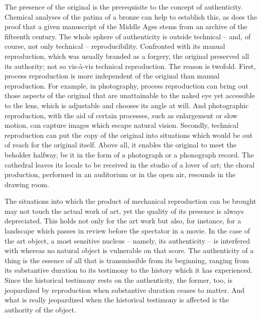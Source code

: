 \documentclass[11pt, letterpaper]{article}
\begin{document}
The presence of the original is the prerequisite to the concept of
authenticity. Chemical analyses of the patina of a bronze can help to establish
this, as does the proof that a given manuscript of the Middle Ages stems from
an archive of the fifteenth century. The whole sphere of authenticity is
outside technical – and, of course, not only technical – reproducibility.
Confronted with its manual reproduction, which was usually branded as a
forgery, the original preserved all its authority; not so vis-à-vis technical
reproduction. The reason is twofold. First, process reproduction is more
independent of the original than manual reproduction. For example, in
photography, process reproduction can bring out those aspects of the original
that are unattainable to the naked eye yet accessible to the lens, which is
adjustable and chooses its angle at will. And photographic reproduction, with
the aid of certain processes, such as enlargement or slow motion, can capture
images which escape natural vision. Secondly, technical reproduction can put
the copy of the original into situations which would be out of reach for the
original itself. Above all, it enables the original to meet the beholder
halfway, be it in the form of a photograph or a phonograph record. The
cathedral leaves its locale to be received in the studio of a lover of art; the
choral production, performed in an auditorium or in the open air, resounds in
the drawing room.

The situations into which the product of mechanical reproduction can be brought
may not touch the actual work of art, yet the quality of its presence is always
depreciated. This holds not only for the art work but also, for instance, for a
landscape which passes in review before the spectator in a movie. In the case
of the art object, a most sensitive nucleus – namely, its authenticity – is
interfered with whereas no natural object is vulnerable on that score. The
authenticity of a thing is the essence of all that is transmissible from its
beginning, ranging from its substantive duration to its testimony to the
history which it has experienced. Since the historical testimony rests on the
authenticity, the former, too, is jeopardized by reproduction when substantive
duration ceases to matter. And what is really jeopardized when the historical
testimony is affected is the authority of the object.
\end{document}
